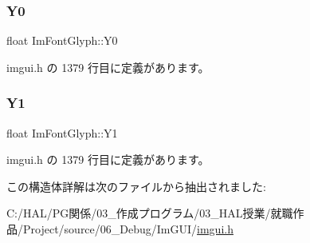 \subsubsection{\texorpdfstring{Y0}{Y0}}
{\footnotesize\ttfamily float Im\+Font\+Glyph\+::\+Y0}



 imgui.\+h の 1379 行目に定義があります。

\mbox{\label{struct_im_font_glyph_aa6a0440694ae06c4cf03316498327bd2}} 
\subsubsection{\texorpdfstring{Y1}{Y1}}
{\footnotesize\ttfamily float Im\+Font\+Glyph\+::\+Y1}



 imgui.\+h の 1379 行目に定義があります。



この構造体詳解は次のファイルから抽出されました\+:\begin{DoxyCompactItemize}
\item 
C\+:/\+H\+A\+L/\+P\+G関係/03\+\_\+作成プログラム/03\+\_\+\+H\+A\+L授業/就職作品/\+Project/source/06\+\_\+\+Debug/\+Im\+G\+U\+I/\mbox{\hyperlink{imgui_8h}{imgui.\+h}}\end{DoxyCompactItemize}
